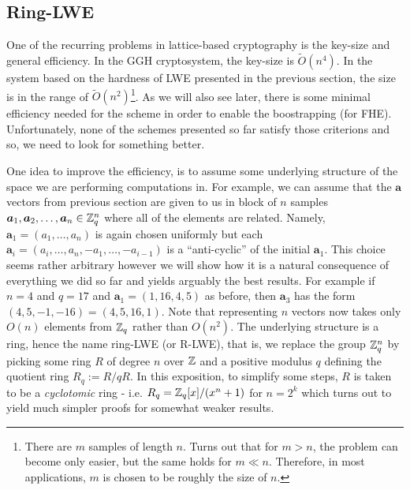 
\subsection{Ring-LWE}\label{ring-lwe}
One of the recurring problems in lattice-based cryptography is the key-size and general efficiency. In the GGH cryptosystem, the key-size is $\tilde{O}(n^4)$. In the system based on the hardness of LWE presented in the previous section, the size is in the range of $\tilde{O}(n^2)$\footnote{There are $m$ samples of length $n$. Turns out that for $m > n$, the problem can become only easier, but the same holds for $m \ll n$. Therefore, in most applications, $m$ is chosen to be roughly the size of $n$.}. As we will also see later, there is some minimal efficiency needed for the scheme in order to enable the boostrapping (for FHE). Unfortunately, none of the schemes presented so far satisfy those criterions and so, we need to look for something better.

One idea to improve the efficiency, is to assume some underlying structure of the space we are performing computations in. For example, we can assume that the $\bm{a}$ vectors from previous section are given to us in block of $n$ samples $\boldsymbol{a}_1, \boldsymbol{a}_2, \dots, \boldsymbol{a}_n \in \mathbb{Z}_q^n$ where all of the elements are related. Namely, $\bm{a}_1 = (a_1, \dots, a_n)$ is again chosen uniformly but each $\bm{a}_i = (a_i, \dots, a_n, -a_1, \dots, -a_{i - 1})$ is a ``anti-cyclic'' of the initial $\bm{a}_1$. This choice seems rather arbitrary however we will show how it is a natural consequence of everything we did so far and yields arguably the best results. For example if $n = 4$ and $q = 17$ and $\bm{a}_1 = (1, 16, 4, 5)$ as before, then $\bm{a}_3$ has the form $(4, 5, -1, -16) = (4, 5, 16, 1)$. Note that representing $n$ vectors now takes only $O(n)$ elements from $\mathbb{Z}_q$ rather than $O(n^2)$. The underlying structure is a ring, hence the name ring-LWE (or R-LWE), that is, we replace the group $\mathbb{Z}_q^n$ by picking some ring $R$ of degree $n$ over $\mathbb{Z}$ and a positive modulus $q$ defining the quotient ring $R_q := R/qR$. In this exposition, to simplify some steps, $R$ is taken to be a \textit{cyclotomic} ring - i.e. $R_q = \mathbb{Z}_q[x]/ (x^n + 1 )$ for $n = 2^k$ which turns out to yield much simpler proofs for somewhat weaker results.

